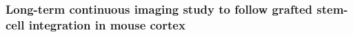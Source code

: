 \subsubsection{Long-term continuous imaging study to follow grafted stem-cell integration in mouse cortex}
